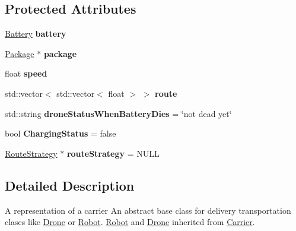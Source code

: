 \subsection*{Protected Attributes}
\begin{DoxyCompactItemize}
\item 
\mbox{\label{classcsci3081_1_1Carrier_a6d5a40dc3672b6b8667bac84a967dfc7}} 
\hyperlink{classcsci3081_1_1Battery}{Battery} {\bfseries battery}
\item 
\mbox{\label{classcsci3081_1_1Carrier_abe593b696584b20307c5eb7fb9184aff}} 
\hyperlink{classcsci3081_1_1Package}{Package} $\ast$ {\bfseries package}
\item 
\mbox{\label{classcsci3081_1_1Carrier_abe394952b911bb17b1acfd88163c9c05}} 
float {\bfseries speed}
\item 
\mbox{\label{classcsci3081_1_1Carrier_ac2d6218c5d9856936c75b270e4e32be6}} 
std\+::vector$<$ std\+::vector$<$ float $>$ $>$ {\bfseries route}
\item 
\mbox{\label{classcsci3081_1_1Carrier_aa8d4466ebdba226c137122012a193633}} 
std\+::string {\bfseries drone\+Status\+When\+Battery\+Dies} = \char`\"{}not dead yet\char`\"{}
\item 
\mbox{\label{classcsci3081_1_1Carrier_aa689bdcb7d895a92ff802b39ab649b21}} 
bool {\bfseries Charging\+Status} = false
\item 
\mbox{\label{classcsci3081_1_1Carrier_a2fc7570deeaf96260542f0cb218225f2}} 
\hyperlink{classcsci3081_1_1RouteStrategy}{Route\+Strategy} $\ast$ {\bfseries route\+Strategy} = N\+U\+LL
\end{DoxyCompactItemize}


\subsection{Detailed Description}
A representation of a carrier An abstract base class for delivery transportation clases like \hyperlink{classcsci3081_1_1Drone}{Drone} or \hyperlink{classcsci3081_1_1Robot}{Robot}. \hyperlink{classcsci3081_1_1Robot}{Robot} and \hyperlink{classcsci3081_1_1Drone}{Drone} inherited from \hyperlink{classcsci3081_1_1Carrier}{Carrier}. 

